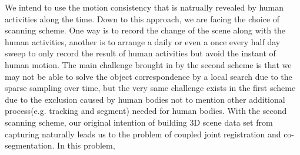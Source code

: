 We intend to use the motion consistency that is natrually revealed by human activities along the time. Down to this approach, we are facing the choice of scanning scheme. One way is to record the change of the scene along with the human activities, another is to arrange a daily or even a once every half day sweep to only record the result of human activities but avoid the instant of human motion. The main challenge brought in by the second scheme is that we may not be able to solve the object correspondence by a local search due to the sparse sampling over time, but the very same challenge exists in the first scheme due to the exclusion caused by human bodies not to mention other additional process(e.g. tracking and segment) needed for human bodies. With the second scanning scheme, our original intention of building 3D scene data set from capturing naturally leads us to the problem of coupled joint registration and co-segmentation. In this problem,    
      
